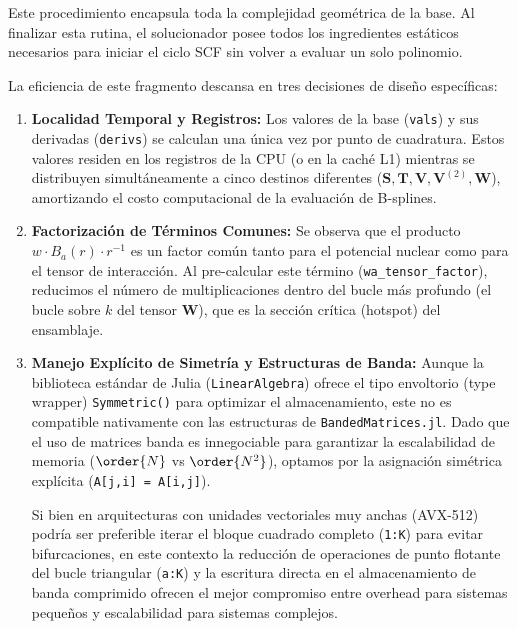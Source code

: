 Este procedimiento encapsula toda la complejidad geométrica de la base. Al finalizar esta rutina, el solucionador posee todos los ingredientes estáticos necesarios para iniciar el ciclo SCF sin volver a evaluar un solo polinomio.

La eficiencia de este fragmento descansa en tres decisiones de diseño específicas:

\begin{enumerate}
    \item \textbf{Localidad Temporal y Registros:} Los valores de la base (\texttt{vals}) y sus derivadas (\texttt{derivs}) se calculan una única vez por punto de cuadratura. Estos valores residen en los registros de la CPU (o en la caché L1) mientras se distribuyen simultáneamente a cinco destinos diferentes (\(\mathbf{S}, \mathbf{T}, \mathbf{V}, \mathbf{V}^{(2)}, \mathbf{W}\)), amortizando el costo computacional de la evaluación de B-splines.
    
    \item \textbf{Factorización de Términos Comunes:} Se observa que el producto \( w \cdot B_a(r) \cdot r^{-1} \) es un factor común tanto para el potencial nuclear como para el tensor de interacción. Al pre-calcular este término (\texttt{wa\_tensor\_factor}), reducimos el número de multiplicaciones dentro del bucle más profundo (el bucle sobre \( k \) del tensor \(\mathbf{W}\)), que es la sección crítica (hotspot) del ensamblaje.
    
    \item \textbf{Manejo Explícito de Simetría y Estructuras de Banda:} 
    Aunque la biblioteca estándar de Julia (\texttt{LinearAlgebra}) ofrece el tipo envoltorio (type wrapper) \texttt{Symmetric()} para optimizar el almacenamiento, este no es compatible nativamente con las estructuras de \texttt{BandedMatrices.jl}. Dado que el uso de matrices banda es innegociable para garantizar la escalabilidad de memoria (\(\order{N}\) vs \(\order{N^2}\)), optamos por la asignación simétrica explícita (\texttt{A[j,i] = A[i,j]}). 
    
    Si bien en arquitecturas con unidades vectoriales muy anchas (AVX-512) podría ser preferible iterar el bloque cuadrado completo (\texttt{1:K}) para evitar bifurcaciones, en este contexto la reducción de operaciones de punto flotante del bucle triangular (\texttt{a:K}) y la escritura directa en el almacenamiento de banda comprimido ofrecen el mejor compromiso entre overhead para sistemas pequeños y escalabilidad para sistemas complejos.
\end{enumerate}

